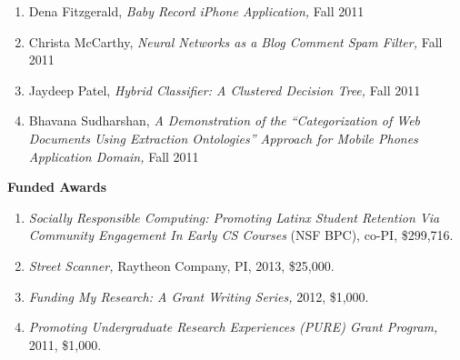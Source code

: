 \documentclass[11pt]{letter}
\begin{document}
\begin{enumerate}
\item Dena Fitzgerald, \emph{Baby Record iPhone Application,} Fall 2011
\item Christa McCarthy, \emph{Neural Networks as a Blog Comment Spam Filter,} Fall 2011
\item Jaydeep Patel, \emph{Hybrid Classifier: A Clustered Decision Tree,} Fall 2011
\item Bhavana Sudharshan, \emph{A Demonstration of the ``Categorization of Web Documents Using Extraction Ontologies'' Approach for Mobile Phones Application Domain,} Fall 2011
\end{enumerate}



\textbf{Funded Awards}
\begin{enumerate}
\item \emph{Socially Responsible Computing: Promoting Latinx Student Retention Via Community Engagement In Early CS Courses} (NSF BPC), co-PI, \$299,716.
\item \emph{Street Scanner,} Raytheon Company, PI, 2013, \$25,000.
\item \emph{Funding My Research: A Grant Writing Series,} 2012, \$1,000.
\item \emph{Promoting Undergraduate Research Experiences (PURE) Grant Program,} 2011, \$1,000.
\end{enumerate}
\end{document}
